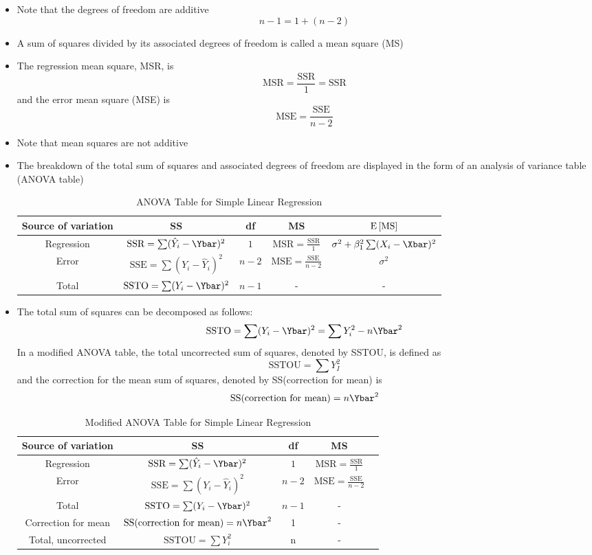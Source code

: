 \begin{itemize}
\item Note that the degrees of freedom are additive $$ n-1 = 1 + (n-2) $$ 
\item A sum of squares divided by its associated degrees of freedom is called a mean square (MS)
\item The regression mean square, MSR, is $$ \text{MSR} = \frac{\text{SSR}}{1} = \text{SSR} $$ and the error mean square (MSE) is $$ \text{MSE} = \frac{\text{SSE}}{n-2} $$ 
\item Note that mean squares are not additive 
\item The breakdown of the total sum of squares and associated degrees of freedom are displayed in the form of an analysis of variance table (ANOVA table)
\begin{table}[h!]
\centering
\begin{tabular}{|c|c|c|c|c|} \hline 
Source of variation & SS & df & MS & $\mathrm{E}\left[ \text{MS} \right]$ \\ \hline 
Regression & $\text{SSR} = \sum (\hat{Y}_i - \Ybar)^2$ & $1$ &  $\text{MSR} = \frac{\text{SSR}}{1}$ & $\sigma^2 + \beta_1^2\sum (X_i - \Xbar)^2$ \\ \hline 
Error & $\text{SSE} = \sum (Y_i - \hat{Y}_i)^2$ & $n-2$ & $\text{MSE} = \frac{\text{SSE}}{n-2}$ & $\sigma^2$ \\ \hline 
Total & $\text{SSTO} = \sum (Y_i - \Ybar)^2$ & $n-1$  & - & - \\ \hline \end{tabular} \caption*{ANOVA Table for Simple Linear Regression}  \end{table}
\item The total sum of squares can be decomposed as follows: $$ \text{SSTO} = \sum (Y_i - \Ybar)^2 = \sum Y_i^2 - n\Ybar^2 $$ In a modified ANOVA table, the total uncorrected sum of squares, denoted by SSTOU, is defined as $$ \text{SSTOU} = \sum Y_I^2 $$ and the correction for the mean sum of squares, denoted by SS(correction for mean) is $$ \text{SS(correction for mean)} = n\Ybar^2 $$ 
\begin{table}[h!]
\centering
\begin{tabular}{|c|c|c|c|c|} \hline 
Source of variation & SS & df & MS \\ \hline 
Regression & $\text{SSR} = \sum (\hat{Y}_i - \Ybar)^2$ & $1$ &  $\text{MSR} = \frac{\text{SSR}}{1}$  \\ \hline 
Error & $\text{SSE} = \sum (Y_i - \hat{Y}_i)^2$ & $n-2$ & $\text{MSE} = \frac{\text{SSE}}{n-2}$  \\ \hline 
Total & $\text{SSTO} = \sum (Y_i - \Ybar)^2$ & $n-1$  & -  \\ \hline 
Correction for mean & $\text{SS(correction for mean)} = n\Ybar^2$ & 1 & - \\ \hline
Total, uncorrected & $\text{SSTOU} = \sum Y_i^2$ & n & - \\ \hline \end{tabular} \caption*{Modified ANOVA Table for Simple Linear Regression}  \end{table} 


\end{itemize}

